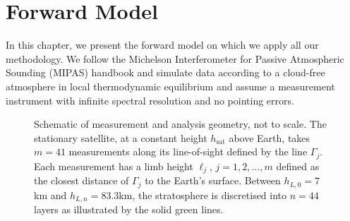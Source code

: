 \chapter{Forward Model}
\label{ch:formodel}

In this chapter, we present the forward model on which we apply all our methodology. We follow the Michelson Interferometer for Passive Atmospheric Sounding (MIPAS) handbook \cite{mipas2000handbook} and simulate data according to a cloud-free atmosphere in local thermodynamic equilibrium and assume a measurement instrument with infinite spectral resolution and no pointing errors.
\begin{figure}[ht!]
	\centering
	
	\caption[Schematic of measurement and analysis geometry.]{Schematic of measurement and analysis geometry, not to scale.
		The stationary satellite, at a constant height $h_\text{sat}$ above Earth, takes $m = 41$ measurements along its line-of-sight defined by the line $\Gamma_j$.
		Each measurement has a limb height $\ell_j$, $j=1,2,\dots,m$ defined as the closest distance of $\Gamma_j$ to the Earth's surface.
		Between $h_{L,0} = 7$km and $h_{L,n} = 83.3$km, the stratosphere is discretised into $n =44$ layers as illustrated by the solid green lines.}
	\label{fig:LIMB}
\end{figure}


